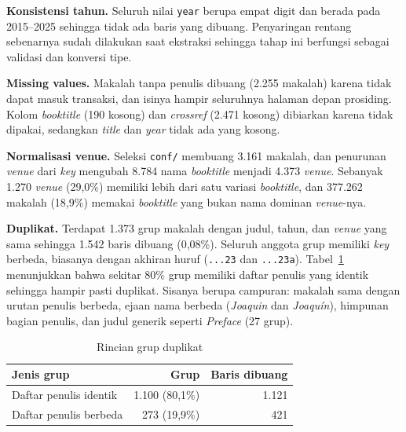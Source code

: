 \textbf{Konsistensi tahun.} Seluruh nilai \texttt{year} berupa empat digit dan berada pada 2015--2025 sehingga tidak ada baris yang dibuang. Penyaringan rentang sebenarnya sudah dilakukan saat ekstraksi sehingga tahap ini berfungsi sebagai validasi dan konversi tipe.

\textbf{Missing values.} Makalah tanpa penulis dibuang (2.255 makalah) karena tidak dapat masuk transaksi, dan isinya hampir seluruhnya halaman depan prosiding. Kolom \textit{booktitle} (190 kosong) dan \textit{crossref} (2.471 kosong) dibiarkan karena tidak dipakai, sedangkan \textit{title} dan \textit{year} tidak ada yang kosong.

\textbf{Normalisasi venue.} Seleksi \texttt{conf/} membuang 3.161 makalah, dan penurunan \textit{venue} dari \textit{key} mengubah 8.784 nama \textit{booktitle} menjadi 4.373 \textit{venue}. Sebanyak 1.270 \textit{venue} (29,0\%) memiliki lebih dari satu variasi \textit{booktitle}, dan 377.262 makalah (18,9\%) memakai \textit{booktitle} yang bukan nama dominan \textit{venue}-nya.

\textbf{Duplikat.} Terdapat 1.373 grup makalah dengan judul, tahun, dan \textit{venue} yang sama sehingga 1.542 baris dibuang (0,08\%). Seluruh anggota grup memiliki \textit{key} berbeda, biasanya dengan akhiran huruf (\texttt{...23} dan \texttt{...23a}). Tabel~\ref{tab:duplikat} menunjukkan bahwa sekitar 80\% grup memiliki daftar penulis yang identik sehingga hampir pasti duplikat. Sisanya berupa campuran: makalah sama dengan urutan penulis berbeda, ejaan nama berbeda (\textit{Joaquin} dan \textit{Joaquín}), himpunan bagian penulis, dan judul generik seperti \textit{Preface} (27 grup).

\begin{table}[ht]
\caption{Rincian grup duplikat}
\label{tab:duplikat}
\small
\begin{tabular}{@{}lrr@{}}
\toprule
\textbf{Jenis grup} & \textbf{Grup} & \textbf{Baris dibuang} \\
\midrule
Daftar penulis identik & 1.100 (80,1\%) & 1.121 \\
Daftar penulis berbeda & 273 (19,9\%) & 421 \\
\bottomrule
\end{tabular}
\end{table}

